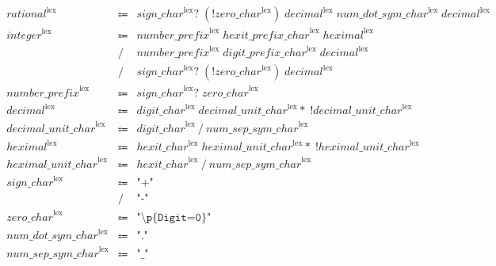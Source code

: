 \begin{align*}
    \begin{array}{rcll}
        \mathit{rational}^\mathrm{lex}
        &\Coloneq &\mathit{sign\_char}^\mathrm{lex}{?}\; (\mathop{!} \mathit{zero\_char}^\mathrm{lex})\; \mathit{decimal}^\mathrm{lex}\; \mathit{num\_dot\_sym\_char}^\mathrm{lex}\; \mathit{decimal}^\mathrm{lex} \\
        \mathit{integer}^\mathrm{lex}
        &\Coloneq &\mathit{number\_prefix}^\mathrm{lex}\; \mathit{hexit\_prefix\_char}^\mathrm{lex}\; \mathit{heximal}^\mathrm{lex} \\
        &\mathrel{/} &\mathit{number\_prefix}^\mathrm{lex}\; \mathit{digit\_prefix\_char}^\mathrm{lex}\; \mathit{decimal}^\mathrm{lex} \\
        &\mathrel{/} &\mathit{sign\_char}^\mathrm{lex}{?}\; (\mathop{!} \mathit{zero\_char}^\mathrm{lex})\; \mathit{decimal}^\mathrm{lex} \\
        \mathit{number\_prefix}^\mathrm{lex}
        &\Coloneq &\mathit{sign\_char}^\mathrm{lex}{?}\; \mathit{zero\_char}^\mathrm{lex} \\
        \mathit{decimal}^\mathrm{lex}
        &\Coloneq &\mathit{digit\_char}^\mathrm{lex}\; \mathit{decimal\_unit\_char}^\mathrm{lex}{*}\; \mathop{!} \mathit{decimal\_unit\_char}^\mathrm{lex} \\
        \mathit{decimal\_unit\_char}^\mathrm{lex}
        &\Coloneq &\mathit{digit\_char}^\mathrm{lex} \mathrel{/} \mathit{num\_sep\_sym\_char}^\mathrm{lex} \\
        \mathit{heximal}^\mathrm{lex}
        &\Coloneq &\mathit{hexit\_char}^\mathrm{lex}\; \mathit{heximal\_unit\_char}^\mathrm{lex}{*}\; \mathop{!} \mathit{heximal\_unit\_char}^\mathrm{lex} \\
        \mathit{heximal\_unit\_char}^\mathrm{lex}
        &\Coloneq &\mathit{hexit\_char}^\mathrm{lex} \mathrel{/} \mathit{num\_sep\_sym\_char}^\mathrm{lex} \\
        \mathit{sign\_char}^\mathrm{lex}
        &\Coloneq &\texttt{"+"} \\
        &\mathrel{/} &\texttt{"-"} \\
        \mathit{zero\_char}^\mathrm{lex}
        &\Coloneq &\texttt{"\textbackslash p\{Digit=0\}"} \\
        \mathit{num\_dot\_sym\_char}^\mathrm{lex}
        &\Coloneq &\texttt{"."} \\
        \mathit{num\_sep\_sym\_char}^\mathrm{lex}
        &\Coloneq &\texttt{"\_"} \\

\end{array}
\end{align*}
